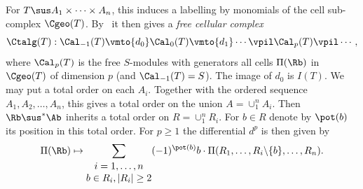 \medskip
{}
  For $T \sus A_1 \times \cdots \times A_n$, this induces a labelling
by monomials of the cell sub-complex $\Cgeo(T)$.
By~\cite[Section 4]{MiSt} it then gives a {\it free cellular complex}
\[ \Ctalg(T) : \Cal_{-1}(T) \vmto{d_0} \Cal_0(T) \vmto{d_1}
  \cdots \vpil \Cal_p(T) \vpil \cdots , \]
where
$\Cal_p(T)$ is the free $S$-modules with generators all cells $\Pi(\Rb)$ in
$\Cgeo(T)$ of dimension $p$ (and $\Cal_{-1}(T) = S$).
The image of $d_0$ is $I(T)$.
We may put a total order on each $A_i$. Together with the ordered
sequence $A_1, A_2, \ldots, A_n$, this gives a total order on the
union $A = \cup_1^n A_i$. Then $\Rb \sus^{*} \Ab$ inherits a total order on
$R = \cup_1^n R_i$. For $b \in R$ denote by $\pot(b)$ its position in
this total order. For $p \geq 1$
the differential $d^p$ is then given by
\begin{equation} \label{eq:minfree-diff}
  \Pi(\Rb) \mapsto \sum_{\begin{matrix} i = 1, \ldots, n\\
      b \in R_i, |R_i| \geq 2 \end{matrix}}  (-1)^{\pot(b)} b \cdot
  \Pi(R_1, \ldots, R_i\backslash \{b \}, \ldots, R_n).
\end{equation}

